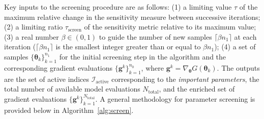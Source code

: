 Key inputs to the screening procedure
are as follows: (1) 
a limiting value $\tau$ of the maximum relative change in the sensitivity
measure between successive iterations; (2) 
a limiting ratio $\tau_\text{screen}$ of the sensitivity metric 
relative to its maximum value;
(3) a real number $\beta \in (0, 1)$ to 
guide the number of new samples $\lceil \beta n_1 \rceil$ 
at each iteration ($\lceil \beta n_1
\rceil$ 
is the smallest integer greater than or equal to $\beta n_1$); 
(4) a set of samples $\{ \bm{\theta}_k \}_{k = 1}^{n_1}$ 
for the initial screening step in
the algorithm and the corresponding gradient evaluations 
$\{ \bm{g}^k \}_{k=1}^{n_0}$, where
$\bm{g}^k = \nabla_{\bm{\theta}} G(\bm{\theta}_k)$. 
The outputs are the set of active
indices $\mathcal{I}_\text{active}$ corresponding to the 
\emph{important parameters}, the total number of available model 
evaluations $N_\text{total}$, and the enriched set of gradient evaluations 
$\{ \bm{g}^k\}_{k=1}^{N_\text{total}}$. 
A general methodology for parameter screening is provided below in
Algorithm~\ref{alg:screen}.


